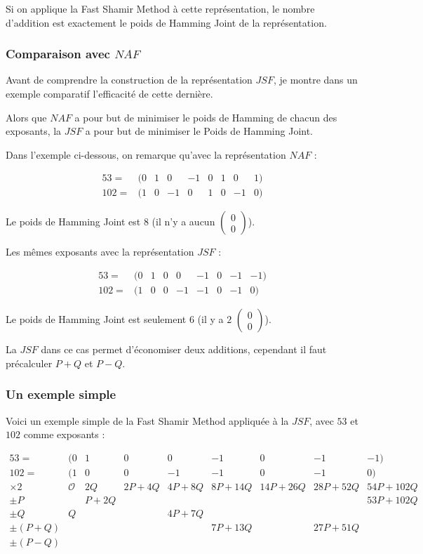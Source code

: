 \documentclass[12pt, a4paper]{memoir}
\newcommand{\doublezero}{\begin{pmatrix} 0 \\ 0 \end{pmatrix}}
\begin{document}
Si on applique la Fast Shamir Method à cette représentation, le nombre d'addition est exactement le poids de Hamming Joint
de la représentation.

\subsubsection{Comparaison avec $NAF$}

Avant de comprendre la construction de la représentation $JSF$, je montre dans un exemple comparatif l'efficacité
de cette dernière.

Alors que $NAF$ a pour but de minimiser le poids de Hamming de chacun des exposants, la $JSF$ a pour but de
minimiser le Poids de Hamming Joint.

Dans l'exemple ci-dessous, on remarque qu'avec la représentation $NAF$ :

  $$\begin{array}{cccccccccc}
  53 = & (0 & 1 & 0 & -1 & 0 & 1 & 0 & 1) \\
  102 = & (1 & 0 & -1 & 0 & 1 & 0 & -1 & 0)
  \end{array}$$

  Le poids de Hamming Joint est $8$ (il n'y a aucun $\doublezero$).
  
Les mêmes exposants avec la représentation $JSF$ :

  $$\begin{array}{cccccccccc}
  53 = & (0 & 1 & 0 & 0 & -1 & 0 & -1 & -1) \\
  102 = & (1 & 0 & 0 & -1 & -1 & 0 & -1 & 0)
  \end{array}$$

  Le poids de Hamming Joint est seulement $6$ (il y a $2$ $\doublezero$).
  
  La $JSF$ dans ce cas permet d'économiser deux additions, cependant il faut précalculer $P+Q$ et $P-Q$.
  
\subsubsection{Un exemple simple}

Voici un exemple simple de la Fast Shamir Method appliquée à la $JSF$, avec $53$ et $102$ comme exposants :

  $$\begin{array}{cccccccccc}
  53  = & (0 & 1 & 0 &  0 & -1 & 0 & -1 & -1) \\
  102 = & (1 & 0 & 0 & -1 & -1 & 0 & -1 &  0) \\
  \times 2   & \mathcal{O} & 2Q   & 2P+4Q & 4P+8Q & 8P+14Q & 14P+26Q & 28P+52Q & 54P+102Q \\
  \pm P      &             & P+2Q & \,    & \,    & \,     & \,      & \,      & 53P+102Q \\
  \pm Q      & Q           & \,   & \,    & 4P+7Q & \,     & \,      & \,      & \,       \\
  \pm (P+Q)  &             & \,   & \,    & \,    & 7P+13Q & \,      & 27P+51Q & \,       \\
  \pm (P-Q)  &             & \,   & \,    & \,    & \,     & \,      & \,      & \,
  \end{array}$$
  
\end{document}
